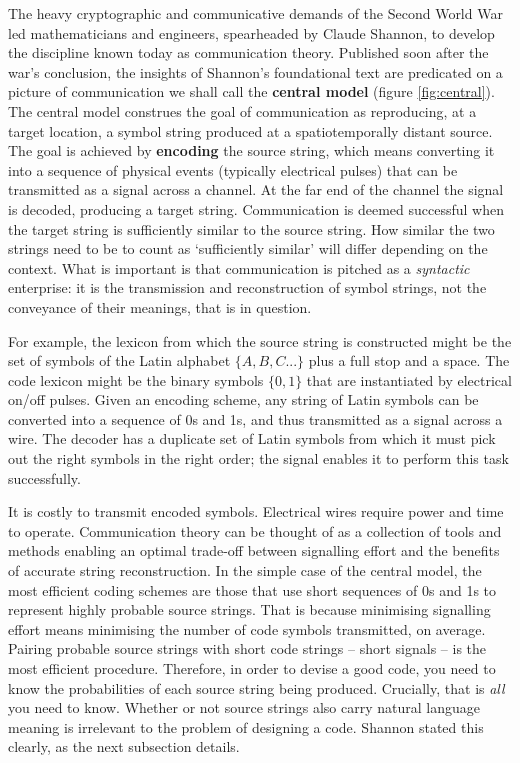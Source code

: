 \documentclass[12pt]{article}
\begin{document}
The heavy cryptographic and communicative demands of the Second World War led mathematicians and engineers, spearheaded by Claude Shannon, to develop the discipline known today as communication theory.
Published soon after the war's conclusion, the insights of Shannon's foundational text \parencite*{shannon1948mathematicalc} are predicated on a picture of communication we shall call the \textbf{central model} (figure \ref{fig:central}).
The central model construes the goal of communication as reproducing, at a target location, a symbol string produced at a spatiotemporally distant source.
The goal is achieved by \textbf{encoding} the source string, which means converting it into a sequence of physical events (typically electrical pulses) that can be transmitted as a signal across a channel.
At the far end of the channel the signal is decoded, producing a target string.
Communication is deemed successful when the target string is sufficiently similar to the source string.
How similar the two strings need to be to count as `sufficiently similar' will differ depending on the context.
What is important is that communication is pitched as a \textit{syntactic} enterprise: it is the transmission and reconstruction of symbol strings, not the conveyance of their meanings, that is in question.

For example, the lexicon from which the source string is constructed might be the set of symbols of the Latin alphabet $\{A,B,C...\}$ plus a full stop and a space.
The code lexicon might be the binary symbols $\{0,1\}$ that are instantiated by electrical on/off pulses.
Given an encoding scheme, any string of Latin symbols can be converted into a sequence of 0s and 1s, and thus transmitted as a signal across a wire.
The decoder has a duplicate set of Latin symbols from which it must pick out the right symbols in the right order; the signal enables it to perform this task successfully.

It is costly to transmit encoded symbols.
Electrical wires require power and time to operate.
Communication theory can be thought of as a collection of tools and methods enabling an optimal trade-off between signalling effort and the benefits of accurate string reconstruction.
In the simple case of the central model, the most efficient coding schemes are those that use short sequences of 0s and 1s to represent highly probable source strings.
That is because minimising signalling effort means minimising the number of code symbols transmitted, on average.
Pairing probable source strings with short code strings -- short signals -- is the most efficient procedure.
Therefore, in order to devise a good code, you need to know the probabilities of each source string being produced.
Crucially, that is \textit{all} you need to know.
Whether or not source strings also carry natural language meaning is irrelevant to the problem of designing a code.
Shannon stated this clearly, as the next subsection details.
\end{document}
